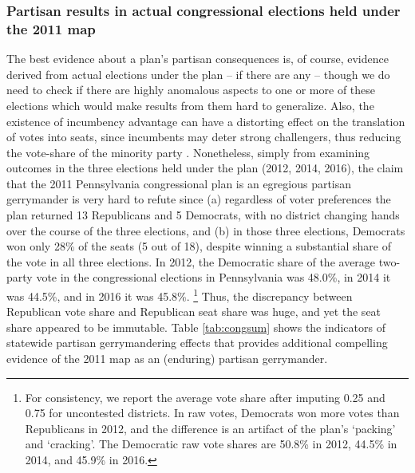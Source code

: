         \subsubsection*{Partisan results in actual congressional elections held under the 2011 map}
%
    The best evidence about a plan’s partisan consequences is, of course, evidence derived from actual elections under the plan -- if there are any -- though we do need to check if there are highly anomalous aspects to one or more of these elections which would make results from them hard to generalize. Also, the existence of incumbency advantage can have a distorting effect on the translation of votes into seats, since incumbents may deter strong challengers, thus reducing the vote-share of the minority party \citep{Jacobson_Kernell_1981, Abramowitz1991}. Nonetheless, simply from examining outcomes in the three elections held under the plan (2012, 2014, 2016), the claim that the 2011 Pennsylvania congressional plan is an egregious partisan gerrymander is very hard to refute since (a) regardless of voter preferences the plan returned 13 Republicans and 5 Democrats, with no district changing hands over the course of the three elections, and (b) in those three elections, Democrats won only 28\% of the seats (5 out of 18), despite winning a substantial share of the vote in all three elections. In 2012, the Democratic share of the average two-party vote in the congressional elections in Pennsylvania was 48.0\%, in 2014 it was 44.5\%, and in 2016 it was 45.8\%. 
        \footnote{For consistency, we report the average vote share after imputing 0.25 and 0.75 for uncontested districts. In raw votes, Democrats won more votes than Republicans in 2012, and the difference is an artifact of the plan's `packing' and `cracking'. The Democratic raw vote shares are 50.8\% in 2012, 44.5\% in 2014, and 45.9\% in 2016.}
    Thus, the discrepancy between Republican vote share and Republican seat share was huge, and yet the seat share appeared to be immutable. Table \ref{tab:congsum} shows the indicators of statewide partisan gerrymandering effects that provides additional compelling evidence of the 2011 map as an (enduring) partisan gerrymander.   
